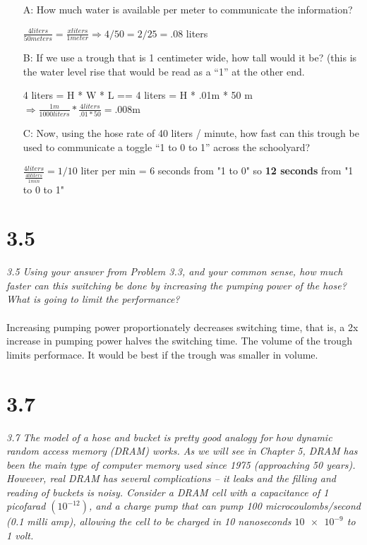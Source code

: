 \documentclass[10pt]{article}
\begin{document}
\begin{itemize}

    \item[A:] How much water is available per meter to communicate the information?
    \item[] $\frac{4 liters}{50 meters} = \frac{x liters}{1 meter} \Rightarrow 4/50 = 2/25 = .08$ liters 
    \item[B:] If we use a trough that is 1 centimeter wide, how tall would it be? (this is the water
    level rise that would be read as a “1” at the other end.
    \item[]  4 liters = H * W * L == 4 liters = H * .01m * 50 m $\Rightarrow \frac{1 m}{1000 liters} * \frac{4 liters}{.01 * 50} = .008$m
    \item[C:] Now, using the hose rate of 40 liters / minute, how fast can this trough be used to
    communicate a toggle “1 to 0 to 1” across the schoolyard?    
    \item[] $\frac{4 liters}{\frac{40 liters}{1 min}} = 1/10$ liter per min = 6 seconds from "1 to 0" so \textbf{12 seconds} from "1 to 0 to 1"
    
\end{itemize}


\section{3.5}

\textit{3.5 Using your answer from Problem 3.3, and your common sense, how much faster can
this switching be done by increasing the pumping power of the hose? What is going to
limit the performance?}

\paragraph{}

    Increasing pumping power proportionately decreases switching time, that is, a 2x increase in pumping power
    halves the switching time. The volume of the trough limits performace. It would be best if the trough was smaller
    in volume. 


\section{3.7}
\textit{
3.7 The model of a hose and bucket is pretty good analogy for how dynamic random access memory (DRAM) works. As we will see in Chapter 5, DRAM has been the main
type of computer memory used since 1975 (approaching 50 years). However, real DRAM
has several complications – it leaks and the filling and reading of buckets is noisy. Consider a DRAM cell with a capacitance of 1 picofarad $(10^{−12})$, and a charge pump that can
pump 100 microcoulombs/second (0.1 milli amp), allowing the cell to be charged in 10
nanoseconds $\num{10e-9}$ to 1 volt.}
\end{document}
